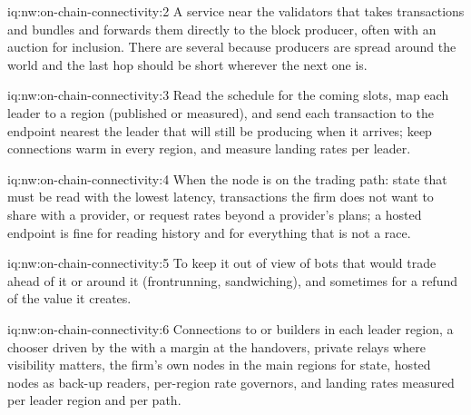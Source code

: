 \begin{solution}{iq:nw:on-chain-connectivity:2}
A service near the validators that takes transactions and bundles and forwards them directly to the block producer, often with an auction for inclusion.
There are several because producers are spread around the world and the last hop should be short wherever the next one is.
\end{solution}

\begin{solution}{iq:nw:on-chain-connectivity:3}
Read the schedule for the coming slots, map each leader to a region (published or measured), and send each transaction to the endpoint nearest the leader
that will still be producing when it arrives; keep connections warm in every region, and measure landing rates per leader.
\end{solution}

\begin{solution}{iq:nw:on-chain-connectivity:4}
When the node is on the trading path: state that must be read with the lowest latency, transactions the firm does not want to share with a provider,
or request rates beyond a provider's plans; a hosted endpoint is fine for reading history and for everything that is not a race.
\end{solution}

\begin{solution}{iq:nw:on-chain-connectivity:5}
To keep it out of view of bots that would trade ahead of it or around it (frontrunning, sandwiching), and sometimes for a refund of the value it creates.
\end{solution}

\begin{solution}{iq:nw:on-chain-connectivity:6}
Connections to  or builders in each leader region, a chooser driven by the  with a margin at the handovers, private relays
where visibility matters, the firm's own nodes in the main regions for state, hosted nodes as back-up readers, per-region rate governors, and landing
rates measured per leader region and per path.
\end{solution}

